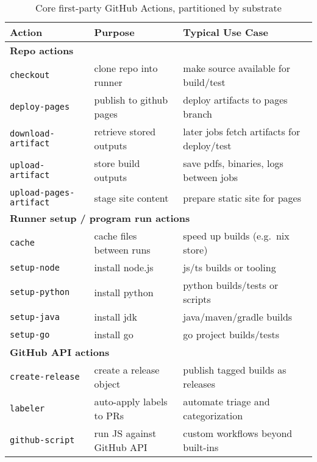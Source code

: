 \documentclass[openany, 12pt]{book}
\begin{document}
\begin{table}[h]
	\centering
	\begin{tabular}{lll}
		\toprule
		\textbf{Action}                & \textbf{Purpose}          & \textbf{Typical Use Case}                  \\
		\midrule
		\multicolumn{3}{l}{\textbf{Repo actions}}                                                               \\
		\midrule
		\texttt{checkout}              & clone repo into runner    & make source available for build/test       \\
		\texttt{deploy-pages}          & publish to github pages   & deploy artifacts to pages branch           \\
		\texttt{download-artifact}     & retrieve stored outputs   & later jobs fetch artifacts for deploy/test \\
		\texttt{upload-artifact}       & store build outputs       & save pdfs, binaries, logs between jobs     \\
		\texttt{upload-pages-artifact} & stage site content        & prepare static site for pages              \\
		\midrule
		\multicolumn{3}{l}{\textbf{Runner setup / program run actions}}                                         \\
		\midrule
		\texttt{cache}                 & cache files between runs  & speed up builds (e.g.\ nix store)          \\
		\texttt{setup-node}            & install node.js           & js/ts builds or tooling                    \\
		\texttt{setup-python}          & install python            & python builds/tests or scripts             \\
		\texttt{setup-java}            & install jdk               & java/maven/gradle builds                   \\
		\texttt{setup-go}              & install go                & go project builds/tests                    \\
		\midrule
		\multicolumn{3}{l}{\textbf{GitHub API actions}}                                                         \\
		\midrule
		\texttt{create-release}        & create a release object   & publish tagged builds as releases          \\
		\texttt{labeler}               & auto-apply labels to PRs  & automate triage and categorization         \\
		\texttt{github-script}         & run JS against GitHub API & custom workflows beyond built-ins          \\
		\bottomrule
	\end{tabular}
	\caption{Core first-party GitHub Actions, partitioned by substrate}
\end{table}
\end{document}
